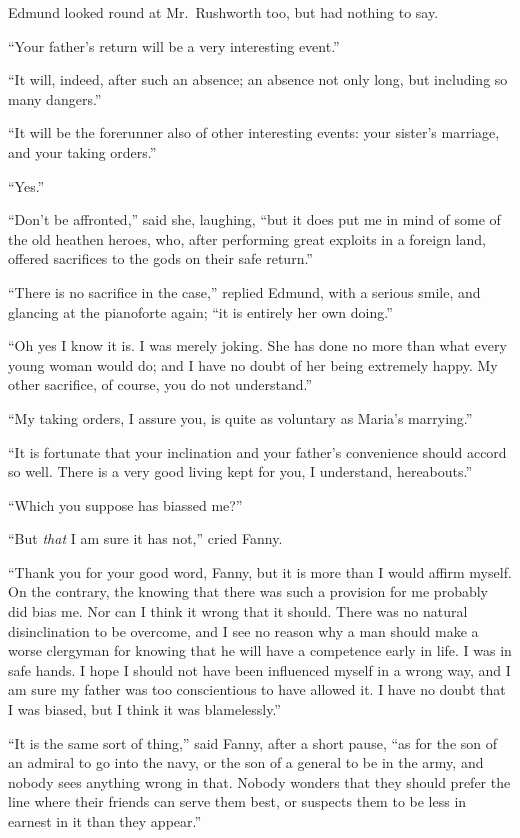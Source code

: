 Edmund looked round at Mr.\ Rushworth too, but had nothing
to say.

``Your father's return will be a very interesting event.''

``It will, indeed, after such an absence; an absence
not only long, but including so many dangers.''

``It will be the forerunner also of other interesting events:
your sister's marriage, and your taking orders.''

``Yes.''

``Don't be affronted,'' said she, laughing, ``but it does
put me in mind of some of the old heathen heroes, who,
after performing great exploits in a foreign land,
offered sacrifices to the gods on their safe return.''

``There is no sacrifice in the case,'' replied Edmund,
with a serious smile, and glancing at the pianoforte again;
``it is entirely her own doing.''

``Oh yes I know it is.  I was merely joking.  She has
done no more than what every young woman would do;
and I have no doubt of her being extremely happy.
My other sacrifice, of course, you do not understand.''

``My taking orders, I assure you, is quite as voluntary
as Maria's marrying.''

``It is fortunate that your inclination and your father's
convenience should accord so well.  There is a very good
living kept for you, I understand, hereabouts.''

``Which you suppose has biassed me?''

``But \emph{that} I am sure it has not,'' cried Fanny.

``Thank you for your good word, Fanny, but it is more than
I would affirm myself.  On the contrary, the knowing
that there was such a provision for me probably did
bias me.  Nor can I think it wrong that it should.
There was no natural disinclination to be overcome,
and I see no reason why a man should make a worse clergyman
for knowing that he will have a competence early in life.
I was in safe hands.  I hope I should not have been
influenced myself in a wrong way, and I am sure my father
was too conscientious to have allowed it.  I have no doubt
that I was biased, but I think it was blamelessly.''

``It is the same sort of thing,'' said Fanny, after a
short pause, ``as for the son of an admiral to go into
the navy, or the son of a general to be in the army,
and nobody sees anything wrong in that.  Nobody wonders
that they should prefer the line where their friends can
serve them best, or suspects them to be less in earnest
in it than they appear.''

